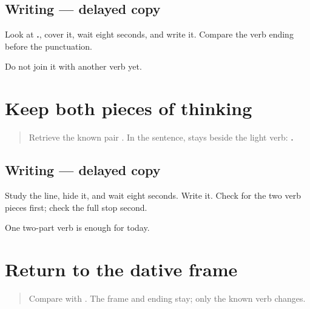 \subsection*{Writing — delayed copy}
Look at \textbf{ .}, cover it, wait eight seconds, and write it. Compare the verb ending before the punctuation.

\begin{tcolorbox}[breakable,colback=teal!4,colframe=teal!35!black,title={Before you move on}]
Do not join it with another verb yet.
\end{tcolorbox}
\section[\texorpdfstring{\mr{मी} \mr{विचार} \mr{करतो}. (mī vichār karto)}{मी विचार करतो. (mī vichār karto)}]{Keep both pieces of thinking}

\label{lesson:MR-A1M08-thinking-line}



\begin{quote}
Retrieve the known pair \textbf{ }. In the sentence, \textbf{} stays beside the light verb: \textbf{  .}
\end{quote}

\subsection*{Writing — delayed copy}
Study the line, hide it, and wait eight seconds. Write it. Check for the two verb pieces first; check the full stop second.

\begin{tcolorbox}[breakable,colback=teal!4,colframe=teal!35!black,title={Before you move on}]
One two-part verb is enough for today.
\end{tcolorbox}
\section[\texorpdfstring{\mr{मला} \mr{मराठी} \mr{समजते}. (malā marāṭhī samajte)}{मला मराठी समजते. (malā marāṭhī samajte)}]{Return to the dative frame}

\label{lesson:MR-A1M09-understanding-line}



\begin{quote}
Compare \textbf{  } with \textbf{  }. The frame and ending stay; only the known verb changes.
\end{quote}

